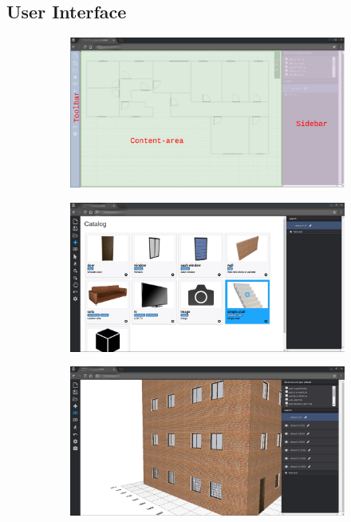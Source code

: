 \subsection{User Interface}\label{ssec:ui}


\begin{figure}[htbp] %
   \centering
   \begin{subfigure}[b]{0.329\textwidth}
   \includegraphics[width=\textwidth]{contents/images/mock-interfaccia}
   \caption{}
   \label{figInterface}
   \end{subfigure}
   \begin{subfigure}[b]{0.329\textwidth}
   \includegraphics[width=\textwidth]{contents/images/figcatalog}
   \caption{}
   \label{figCatalogo}
   \end{subfigure}
   \begin{subfigure}[b]{0.329\textwidth}
   \includegraphics[width=\textwidth]{contents/images/palazzo2}

\end{subfigure}
\end{figure}
